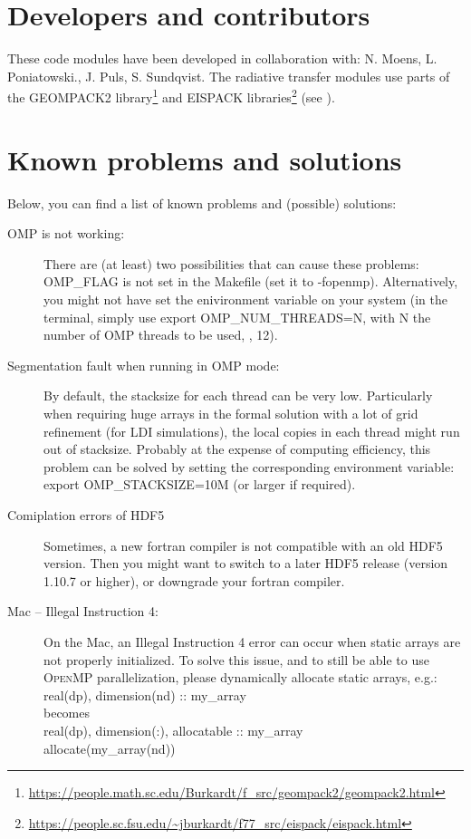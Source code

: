 \documentclass[10pt,a4paper]{article}
\begin{document}
\section{Developers and contributors}
These code modules have been developed in collaboration with: N. Moens, L. Poniatowski., J. Puls, S. Sundqvist.
The radiative transfer modules use parts of the GEOMPACK2 library\footnote{\url{https://people.math.sc.edu/Burkardt/f_src/geompack2/geompack2.html}} and
EISPACK libraries\footnote{\url{https://people.sc.fsu.edu/~jburkardt/f77_src/eispack/eispack.html}} (see \cite{Joe1991}).

\section{Known problems and solutions}
Below, you can find a list of known problems and (possible) solutions:
\begin{description}
\item[OMP is not working:] There are (at least) two possibilities that can cause
  these problems: OMP\_FLAG is not set in the Makefile (set it to
  -fopenmp). Alternatively, you might not have set the enivironment
  variable on your system (in the terminal, simply use export OMP\_NUM\_THREADS=N, with N the number of OMP threads to be used, \eg, 12).
\item[Segmentation fault when running in OMP mode:] By default, the
  stacksize for each thread can be very low. Particularly when
  requiring huge arrays in the formal solution with a lot of
  grid refinement (\eg for LDI simulations), the local copies in each thread might run out of stacksize. Probably at the expense of computing efficiency, this problem can be solved by setting the corresponding environment variable: export OMP\_STACKSIZE=10M  (or larger if required).
\item[Comiplation errors of HDF5] Sometimes, a new fortran compiler is
  not compatible with an old HDF5 version. Then you might want to
  switch to a later HDF5 release (version 1.10.7 or higher), or
  downgrade your fortran compiler.

\item[Mac -- Illegal Instruction 4:] On the Mac, an Illegal Instruction 4 error can occur when static arrays are not properly
  initialized. To solve this issue, and to still be able to use \textsc{OpenMP} parallelization, please dynamically allocate static arrays, e.g.:\\
  real(dp), dimension(nd) :: my\_array \\
  becomes \\
  real(dp), dimension(:), allocatable :: my\_array \\
  allocate(my\_array(nd))
\end{description}
\end{document}
